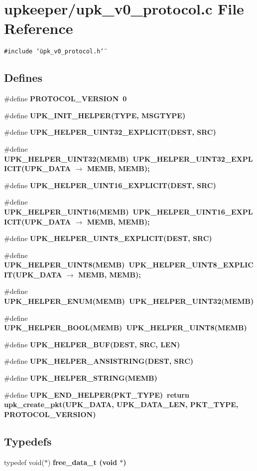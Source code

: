 \section{upkeeper/upk\_\-v0\_\-protocol.c File Reference}
\label{upk__v0__protocol_8c}
{\tt \#include \char`\"{}upk\_\-v0\_\-protocol.h\char`\"{}}\par
\subsection*{Defines}
\begin{CompactItemize}
\item 
\#define \bf{PROTOCOL\_\-VERSION}~0
\item 
\#define \bf{UPK\_\-INIT\_\-HELPER}(TYPE, MSGTYPE)
\item 
\#define \bf{UPK\_\-HELPER\_\-UINT32\_\-EXPLICIT}(DEST, SRC)
\item 
\#define \bf{UPK\_\-HELPER\_\-UINT32}(MEMB)~UPK\_\-HELPER\_\-UINT32\_\-EXPLICIT(UPK\_\-DATA $\rightarrow$ MEMB, MEMB);
\item 
\#define \bf{UPK\_\-HELPER\_\-UINT16\_\-EXPLICIT}(DEST, SRC)
\item 
\#define \bf{UPK\_\-HELPER\_\-UINT16}(MEMB)~UPK\_\-HELPER\_\-UINT16\_\-EXPLICIT(UPK\_\-DATA $\rightarrow$ MEMB, MEMB);
\item 
\#define \bf{UPK\_\-HELPER\_\-UINT8\_\-EXPLICIT}(DEST, SRC)
\item 
\#define \bf{UPK\_\-HELPER\_\-UINT8}(MEMB)~UPK\_\-HELPER\_\-UINT8\_\-EXPLICIT(UPK\_\-DATA $\rightarrow$ MEMB, MEMB);
\item 
\#define \bf{UPK\_\-HELPER\_\-ENUM}(MEMB)~UPK\_\-HELPER\_\-UINT32(MEMB)
\item 
\#define \bf{UPK\_\-HELPER\_\-BOOL}(MEMB)~UPK\_\-HELPER\_\-UINT8(MEMB)
\item 
\#define \bf{UPK\_\-HELPER\_\-BUF}(DEST, SRC, LEN)
\item 
\#define \bf{UPK\_\-HELPER\_\-ANSISTRING}(DEST, SRC)
\item 
\#define \bf{UPK\_\-HELPER\_\-STRING}(MEMB)
\item 
\#define \bf{UPK\_\-END\_\-HELPER}(PKT\_\-TYPE)~return upk\_\-create\_\-pkt(UPK\_\-DATA, UPK\_\-DATA\_\-LEN, PKT\_\-TYPE, PROTOCOL\_\-VERSION)
\end{CompactItemize}
\subsection*{Typedefs}
\begin{CompactItemize}
\item 
typedef void($\ast$) \bf{free\_\-data\_\-t} (void $\ast$)
\end{CompactItemize}
